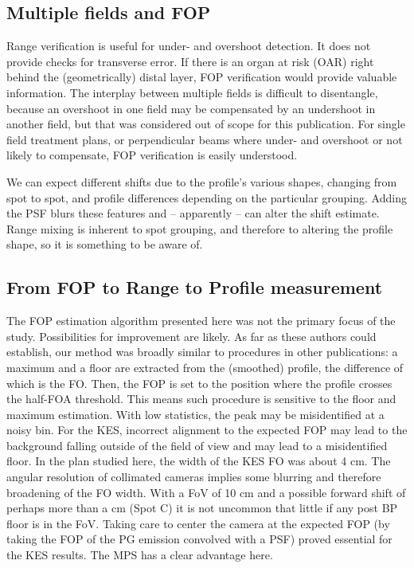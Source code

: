 \documentclass[a4paper,english]{article}
\begin{document}
\subsection{Multiple fields and FOP}

Range verification is useful for under- and overshoot detection. It does not provide checks for transverse error. If there is an organ at risk (OAR) right behind the (geometrically) distal layer, FOP verification would provide valuable information. The interplay between multiple fields is difficult to disentangle, because an overshoot in one field may be compensated by an undershoot in another field, but that was considered out of scope for this publication. For single field treatment plans, or perpendicular beams where under- and overshoot or not likely to compensate, FOP verification is easily understood.

We can expect different shifts due to the profile's various shapes, changing from spot to spot, and profile differences depending on the particular grouping. Adding the PSF blurs these features and -- apparently -- can alter the shift estimate. Range mixing is inherent to spot grouping, and therefore to altering the profile shape, so it is something to be aware of.

\subsection{From FOP to Range to Profile measurement}

The FOP estimation algorithm presented here was not the primary focus of the study. Possibilities for improvement are likely. As far as these authors could establish, our method was broadly similar to procedures in other publications: a maximum and a floor are extracted from the (smoothed) profile, the difference of which is the FO. Then, the FOP is set to the position where the profile crosses the half-FOA threshold. This means such procedure is sensitive to the floor and maximum estimation. With low statistics, the peak may be misidentified at a noisy bin. For the KES, incorrect alignment to the expected FOP may lead to the background falling outside of the field of view and may lead to a misidentified floor. In the plan studied here, the width of the KES FO was about 4 cm. The angular resolution of collimated cameras implies some blurring and therefore broadening of the FO width. With a FoV of 10 cm and a possible forward shift of perhaps more than a cm (Spot C) it is not uncommon that little if any post BP floor is in the FoV. Taking care to center the camera at the expected FOP (by taking the FOP of the PG emission convolved with a PSF) proved essential for the KES results. The MPS has a clear advantage here.
\end{document}
